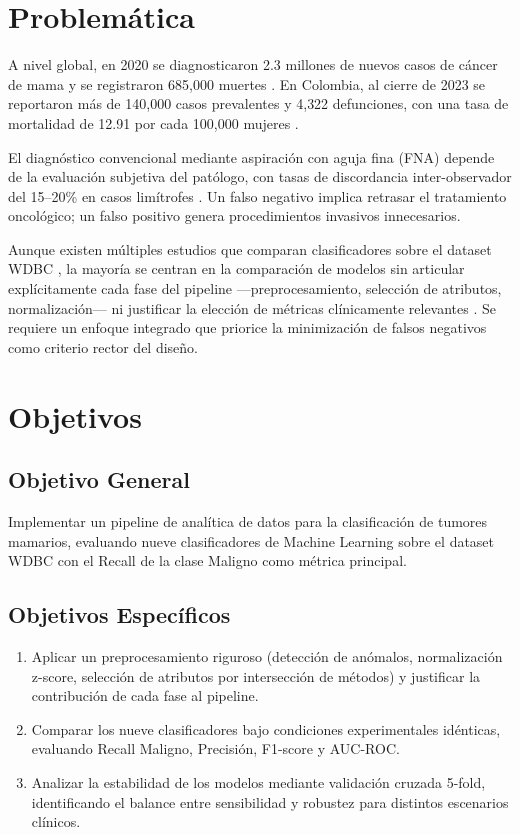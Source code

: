 \documentclass[journal]{IEEEtran}
\begin{document}
\section{Problemática}

A nivel global, en 2020 se diagnosticaron 2.3 millones de nuevos casos de cáncer de mama y se registraron 685{,}000 muertes \cite{sung2021}. En Colombia, al cierre de 2023 se reportaron más de 140{,}000 casos prevalentes y 4{,}322 defunciones, con una tasa de mortalidad de 12.91 por cada 100{,}000 mujeres \cite{cac2024}.

El diagnóstico convencional mediante aspiración con aguja fina (FNA) depende de la evaluación subjetiva del patólogo, con tasas de discordancia inter-observador del 15--20\% en casos limítrofes \cite{elmore2015}. Un falso negativo implica retrasar el tratamiento oncológico; un falso positivo genera procedimientos invasivos innecesarios.

Aunque existen múltiples estudios que comparan clasificadores sobre el dataset WDBC \cite{asri2016, chougrad2018, strelcenia2023, rajpoot2024}, la mayoría se centran en la comparación de modelos sin articular explícitamente cada fase del pipeline —preprocesamiento, selección de atributos, normalización— ni justificar la elección de métricas clínicamente relevantes \cite{remeseiro2019}. Se requiere un enfoque integrado que priorice la minimización de falsos negativos como criterio rector del diseño.

\section{Objetivos}

\subsection{Objetivo General}
Implementar un pipeline de analítica de datos para la clasificación de tumores mamarios, evaluando nueve clasificadores de Machine Learning sobre el dataset WDBC con el Recall de la clase Maligno como métrica principal.

\subsection{Objetivos Específicos}
\begin{enumerate}
  \item Aplicar un preprocesamiento riguroso (detección de anómalos, normalización z-score, selección de atributos por intersección de métodos) y justificar la contribución de cada fase al pipeline.

  \item Comparar los nueve clasificadores bajo condiciones experimentales idénticas, evaluando Recall Maligno, Precisión, F1-score y AUC-ROC.

  \item Analizar la estabilidad de los modelos mediante validación cruzada 5-fold, identificando el balance entre sensibilidad y robustez para distintos escenarios clínicos.
\end{enumerate}
\end{document}
